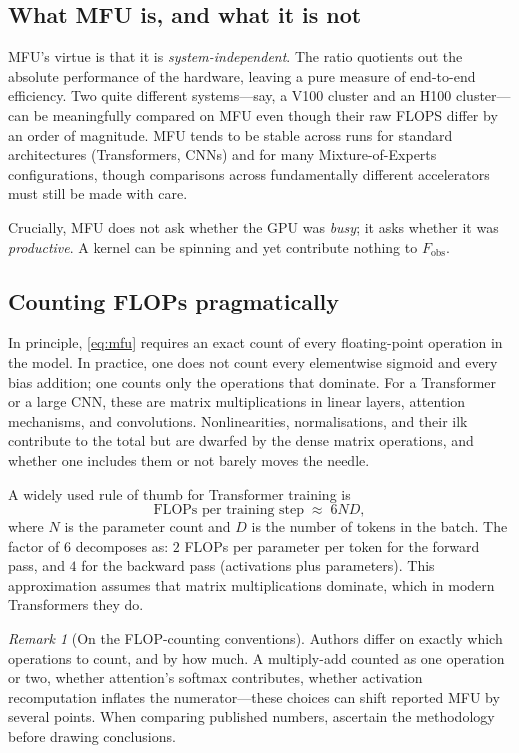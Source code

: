 \documentclass[11pt,a4paper]{article}
\theoremstyle{definition}
\theoremstyle{remark}
\newtheorem*{remark}{Remark}
\theoremstyle{plain}
\begin{document}
\subsection{What MFU is, and what it is not}

MFU's virtue is that it is \emph{system-independent}. The ratio quotients
out the absolute performance of the hardware, leaving a pure measure of
end-to-end efficiency. Two quite different systems---say, a V100 cluster
and an H100 cluster---can be meaningfully compared on MFU even though
their raw FLOPS differ by an order of magnitude. MFU tends to be stable
across runs for standard architectures (Transformers, CNNs) and for many
Mixture-of-Experts configurations, though comparisons across
fundamentally different accelerators must still be made with care.

Crucially, MFU does not ask whether the GPU was \emph{busy}; it asks
whether it was \emph{productive}. A kernel can be spinning and yet
contribute nothing to $F_{\text{obs}}$.

\subsection{Counting FLOPs pragmatically}

In principle, \eqref{eq:mfu} requires an exact count of every
floating-point operation in the model. In practice, one does not count
every elementwise sigmoid and every bias addition; one counts only the
operations that dominate. For a Transformer or a large CNN, these are
matrix multiplications in linear layers, attention mechanisms, and
convolutions. Nonlinearities, normalisations, and their ilk contribute
to the total but are dwarfed by the dense matrix operations, and whether
one includes them or not barely moves the needle.

A widely used rule of thumb for Transformer training is
\begin{equation}
\text{FLOPs per training step} \;\approx\; 6 N D,
\label{eq:6nd}
\end{equation}
where $N$ is the parameter count and $D$ is the number of tokens in the
batch. The factor of $6$ decomposes as: $2$ FLOPs per parameter per token
for the forward pass, and $4$ for the backward pass (activations plus
parameters). This approximation assumes that matrix multiplications
dominate, which in modern Transformers they do.

\begin{remark}[On the FLOP-counting conventions]
Authors differ on exactly which operations to count, and by how much. A
multiply-add counted as one operation or two, whether attention's
softmax contributes, whether activation recomputation inflates the
numerator---these choices can shift reported MFU by several points. When
comparing published numbers, ascertain the methodology before drawing
conclusions.
\end{remark}
\end{document}
